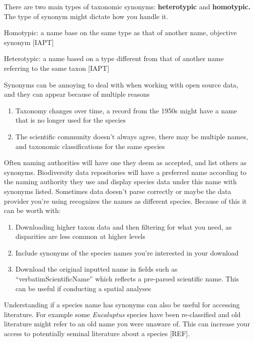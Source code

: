 \documentclass[
  letterpaper,
  DIV=11,
  numbers=noendperiod,
  oneside]{scrreprt}
\providecommand{\tightlist}{%
  \setlength{\itemsep}{0pt}\setlength{\parskip}{0pt}}\usepackage{longtable,booktabs,array}
\begin{document}
There are two main types of taxonomic synonyms: \textbf{heterotypic} and
\textbf{homotypic.} The type of synonym might dictate how you handle it.

Homotypic: a name base on the same type as that of another name,
objective synonym {[}IAPT{]}

Heterotypic: a name based on a type different from that of another name
referring to the same taxon {[}IAPT{]}

Synonyms can be annoying to deal with when working with open source
data, and they can appear because of multiple reasons

\begin{enumerate}
\def\labelenumi{\arabic{enumi}.}
\tightlist
\item
  Taxonomy changes over time, a record from the 1950s might have a name
  that is no longer used for the species
\item
  The scientific community doesn't always agree, there may be multiple
  names, and taxonomic classifications for the same species
\end{enumerate}

Often naming authorities will have one they deem as accepted, and list
others as synonyms. Biodiversity data repositories will have a preferred
name according to the naming authority they use and display species data
under this name with synonyms listed. Sometimes data doesn't parse
correctly or maybe the data provider you're using recognizes the names
as different species. Because of this it can be worth with:

\begin{enumerate}
\def\labelenumi{\arabic{enumi}.}
\tightlist
\item
  Downloading higher taxon data and then filtering for what you need, as
  disparities are less common at higher levels
\item
  Include synonyms of the species names you're interested in your
  download
\item
  Download the original inputted name in fields such as
  ``verbatimScientificName'' which reflects a pre-parsed scientific
  name. This can be useful if conducting a spatial analyses
\end{enumerate}

Understanding if a species name has synonyms can also be useful for
accessing literature. For example some \emph{Eucaluptus} species have
been re-classified and old literature might refer to an old name you
were unaware of. This can increase your access to potentially seminal
literature about a species {[}REF{]}.
\end{document}
